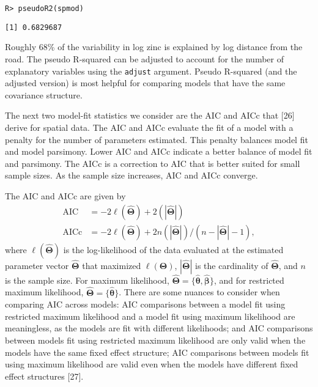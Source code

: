 \documentclass[10pt,letterpaper]{article}
\begin{document}
\begin{verbatim}
R> pseudoR2(spmod)
\end{verbatim}

\begin{verbatim}
[1] 0.6829687
\end{verbatim}

Roughly 68\% of the variability in log zinc is explained by log distance
from the road. The pseudo R-squared can be adjusted to account for the
number of explanatory variables using the \texttt{adjust} argument.
Pseudo R-squared (and the adjusted version) is most helpful for
comparing models that have the same covariance structure.

The next two model-fit statistics we consider are the AIC and AICc that
{[}26{]} derive for spatial data. The AIC and AICc evaluate the fit of a
model with a penalty for the number of parameters estimated. This
penalty balances model fit and model parsimony. Lower AIC and AICc
indicate a better balance of model fit and parsimony. The AICc is a
correction to AIC that is better suited for small sample sizes. As the
sample size increases, AIC and AICc converge.

The AIC and AICc are given by \begin{equation*}\label{eq:sp_aic}
  \begin{split}
    \text{AIC} & = -2\ell(\hat{\boldsymbol{\Theta}}) + 2(|\hat{\boldsymbol{\Theta}}|) \\
    \text{AICc} & = -2\ell(\hat{\boldsymbol{\Theta}}) + 2n(|\hat{\boldsymbol{\Theta}}|) / (n - |\hat{\boldsymbol{\Theta}}| - 1),
  \end{split}
\end{equation*} where \(\ell(\hat{\boldsymbol{\Theta}})\) is the
log-likelihood of the data evaluated at the estimated parameter vector
\(\hat{\boldsymbol{\Theta}}\) that maximized
\(\ell(\boldsymbol{\Theta})\), \(|\hat{\boldsymbol{\Theta}}|\) is the
cardinality of \(\hat{\boldsymbol{\Theta}}\), and \(n\) is the sample
size. For maximum likelihood,
\(\hat{\boldsymbol{\Theta}} = \{\hat{\boldsymbol{\theta}}, \hat{\boldsymbol{\beta}}\}\),
and for restricted maximum likelihood,
\(\hat{\boldsymbol{\Theta}} = \{\hat{\boldsymbol{\theta}}\}\). There are
some nuances to consider when comparing AIC across models: AIC
comparisons between a model fit using restricted maximum likelihood and
a model fit using maximum likelihood are meaningless, as the models are
fit with different likelihoods; and AIC comparisons between models fit
using restricted maximum likelihood are only valid when the models have
the same fixed effect structure; AIC comparisons between models fit
using maximum likelihood are valid even when the models have different
fixed effect structures {[}27{]}.
\end{document}
